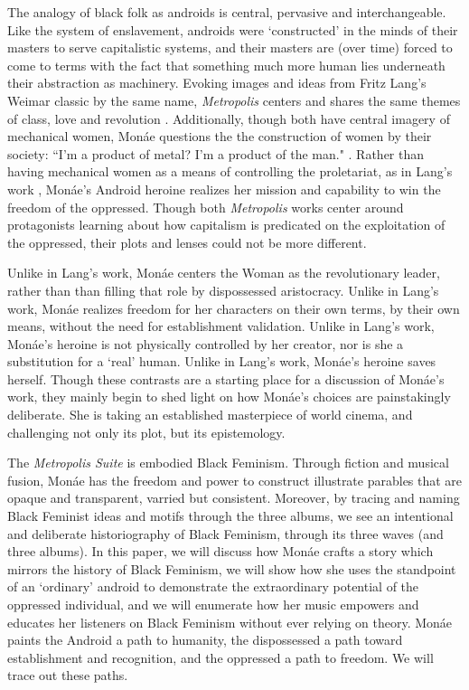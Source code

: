 \documentclass[a4paper, 11pt]{article} %
\begin{document}
The analogy of black folk as androids is central, pervasive and interchangeable. 
Like the system of enslavement, androids were `constructed' in the minds of their masters to serve capitalistic systems, and their masters are (over time) forced to come to terms with the fact that something much more human lies underneath their abstraction as machinery.
Evoking images and ideas from Fritz Lang's Weimar classic by the same name, \emph{Metropolis} centers and shares the same themes of class, love and revolution \cite{metropolis}.
Additionally, though both have central imagery of mechanical women, Mon\'ae questions the the construction of women by their society: ``I'm a product of metal? I'm a product of the man." \cite{happyhunting}. 
Rather than having mechanical women as a means of controlling the proletariat, as in Lang's work \cite{metropolis}, Mon\'ae's Android heroine realizes her mission and capability to win the freedom of the oppressed.
Though both \emph{Metropolis} works center around protagonists learning about how capitalism is predicated on the exploitation of the oppressed, their plots and lenses could not be more different.

Unlike in Lang's work, Mon\'ae centers the Woman as the revolutionary leader, rather than than filling that role by dispossessed aristocracy.
Unlike in Lang's work, Mon\'ae realizes freedom for her characters on their own terms, by their own means, without the need for establishment validation.
Unlike in Lang's work, Mon\'ae's heroine is not physically controlled by her creator, nor is she a substitution for a `real' human.
Unlike in Lang's work, Mon\'ae's heroine saves herself.
Though these contrasts are a starting place for a discussion of Mon\'ae's work, they mainly begin to shed light on how Mon\'ae's choices are painstakingly deliberate.
She is taking an established masterpiece of world cinema, and challenging not only its plot, but its epistemology.

The \emph{Metropolis Suite} is embodied Black Feminism.
Through fiction and musical fusion, Mon\'ae has the freedom and power to construct illustrate parables that are opaque and transparent, varried but consistent.
Moreover, by tracing and naming Black Feminist ideas and motifs through the three albums, we see an intentional and deliberate historiography of Black Feminism, through its three waves (and three albums).
In this paper, we will discuss how Mon\'ae crafts a story which mirrors the history of Black Feminism, we will show how she uses the standpoint of an `ordinary' android to demonstrate the extraordinary potential of the oppressed individual, and we will enumerate how her music empowers and educates her listeners on Black Feminism without ever relying on theory.
Mon\'ae paints the Android a path to humanity, the dispossessed a path toward establishment and recognition, and the oppressed a path to freedom.
We will trace out these paths. 
\end{document}
